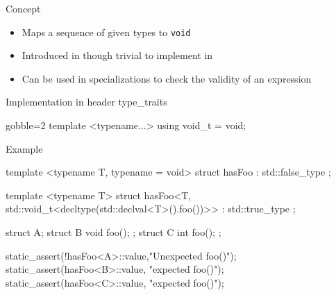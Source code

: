 \begin{frame}[fragile]
  \begin{block}{Concept}
    \begin{itemize}
    \item Maps a sequence of given types to \texttt{void}
    \item Introduced in  though trivial to implement in 
    \item Can be used in specializations to check the validity of an expression
    \end{itemize}
  \end{block}
  \begin{block}{Implementation in header type\_traits}
    \begin{cppcode*}{gobble=2}
      template <typename...>
      using void_t = void;
    \end{cppcode*}
  \end{block}
\end{frame}

\begin{frame}[fragile]
    \begin{exampleblock}{Example}
      \begin{cppcode*}{}
      template <typename T, typename = void>
      struct hasFoo : std::false_type {};

      template <typename T>
      struct hasFoo<T,
         std::void_t<decltype(std::declval<T>().foo())>>
      : std::true_type {};

      struct A{}; struct B{ void foo(); };
      struct C{ int foo(); };

      static_assert(!hasFoo<A>::value,"Unexpected foo()");
      static_assert(hasFoo<B>::value, "expected foo()");
      static_assert(hasFoo<C>::value, "expected foo()");
      \end{cppcode*}
    \end{exampleblock}
\end{frame}

